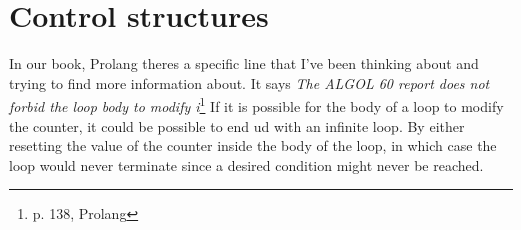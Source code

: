 \section{Control structures}

In our book, Prolang theres a specific line that I've been thinking about and trying to
find more information about. It says \emph{The ALGOL 60 report does not forbid the loop body to modify i}\footnote{p. 138, Prolang}
If it is possible for the body of a loop to modify the counter, it could be possible to end ud with an infinite loop. By either
resetting the value of the counter inside the body of the loop, in which case the loop would never terminate since a 
desired condition might never be reached.